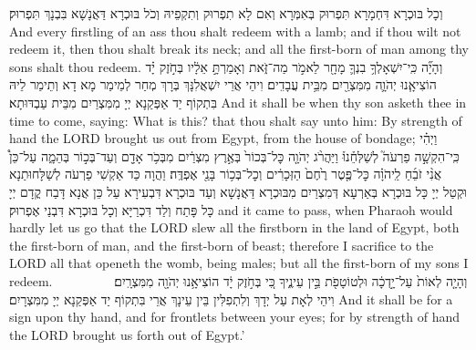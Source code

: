 {{וְכָל בּוּכְרָא דִּחְמָרָא תִּפְרוּק בְּאִמְּרָא וְאִם לָא תִפְרוּק וְתִקְפֵיהּ וְכֹל בּוּכְרָא דַּאֲנָשָׁא בִּבְנָךְ תִּפְרוּק׃}
{And every firstling of an ass thou shalt redeem with a lamb; and if thou wilt not redeem it, then thou shalt break its neck; and all the first-born of man among thy sons shalt thou redeem.}{}
{וְהָיָ֞ה כִּֽי־יִשְׁאָלְךָ֥ בִנְךָ֛ מָחָ֖ר לֵאמֹ֣ר מַה־זֹּ֑את וְאָמַרְתָּ֣ אֵלָ֔יו בְּחֹ֣זֶק יָ֗ד הוֹצִיאָ֧נוּ יְהֹוָ֛ה מִמִּצְרַ֖יִם מִבֵּ֥ית עֲבָדִֽים׃
}
{וִיהֵי אֲרֵי יִשְׁאֲלִנָּךְ בְּרָךְ מְחַר לְמֵימַר מָא דָא וְתֵימַר לֵיהּ בִּתְקוֹף יַד אַפְּקַנָא יְיָ מִמִּצְרַיִם מִבֵּית עַבְדּוּתָא׃}
{And it shall be when thy son asketh thee in time to come, saying: What is this? that thou shalt say unto him: By strength of hand the LORD brought us out from Egypt, from the house of bondage;}{}
{וַיְהִ֗י כִּֽי־הִקְשָׁ֣ה פַרְעֹה֮ לְשַׁלְּחֵ֒נוּ֒ וַיַּהֲרֹ֨ג יְהֹוָ֤ה כׇּל־בְּכוֹר֙ בְּאֶ֣רֶץ מִצְרַ֔יִם מִבְּכֹ֥ר אָדָ֖ם וְעַד־בְּכ֣וֹר בְּהֵמָ֑ה עַל־כֵּן֩ אֲנִ֨י זֹבֵ֜חַ לַֽיהֹוָ֗ה כׇּל־פֶּ֤טֶר רֶ֙חֶם֙ הַזְּכָרִ֔ים וְכׇל־בְּכ֥וֹר בָּנַ֖י אֶפְדֶּֽה׃}
{וַהֲוָה כַּד אַקְשִׁי פַרְעֹה לְשַׁלָּחוּתַנָא וּקְטַל יְיָ כָּל בּוּכְרָא בְּאַרְעָא דְּמִצְרַיִם מִבּוּכְרָא דַּאֲנָשָׁא וְעַד בּוּכְרָא דִּבְעִירָא עַל כֵּן אֲנָא דָּבַח קֳדָם יְיָ כָּל פָּתַח וְלַד דִּכְרַיָּא וְכָל בּוּכְרָא דִּבְנַי אֶפְרוּק׃}
{and it came to pass, when Pharaoh would hardly let us go that the LORD slew all the firstborn in the land of Egypt, both the first-born of man, and the first-born of beast; therefore I sacrifice to the LORD all that openeth the womb, being males; but all the first-born of my sons I redeem.}{}
{וְהָיָ֤ה לְאוֹת֙ עַל־יָ֣דְכָ֔ה וּלְטוֹטָפֹ֖ת בֵּ֣ין עֵינֶ֑יךָ כִּ֚י בְּחֹ֣זֶק יָ֔ד הוֹצִיאָ֥נוּ יְהֹוָ֖ה מִמִּצְרָֽיִם׃ \setuma         
}
{וִיהֵי לְאָת עַל יְדָךְ וְלִתְפִלִּין בֵּין עֵינָךְ אֲרֵי בִּתְקוֹף יַד אַפְּקַנָא יְיָ מִמִּצְרָיִם׃}
{And it shall be for a sign upon thy hand, and for frontlets between your eyes; for by strength of hand the LORD brought us forth out of Egypt.’}{}
}
